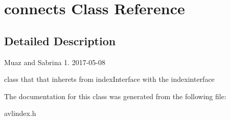 \hypertarget{classconnects}{}\section{connects Class Reference}
\label{classconnects}


\subsection{Detailed Description}
Muaz and Sabrina  1.  2017-\/05-\/08

class that that inherets from index\+Interface with the indexinterface 

The documentation for this class was generated from the following file\+:\begin{DoxyCompactItemize}
\item 
avlindex.\+h\end{DoxyCompactItemize}
